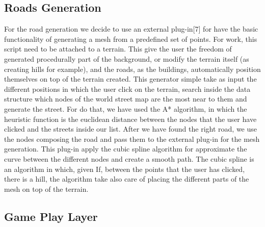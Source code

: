 \documentclass[conference]{IEEEtran}
\begin{document}
\subsection{Roads Generation}

For the road generation we decide to use an external plug-in[7] for have the basic functionality of generating a mesh from a predefined set of points. For work, this script need to be attached to a terrain. This give the user the freedom of generated procedurally part of the background, or modify the terrain itself (as creating hills for example), and the roads, as the buildings, automatically position themselves on top of the terrain created. This generator simple take as input the different positions in which the user click on the terrain, search inside the data structure which nodes of the world street map are the most near to them and generate the street. For do that, we have used the A* algorithm, in which the heuristic function is the euclidean distance between the nodes that the user have clicked and the streets inside our list. After we have found the right road, we use the nodes composing the road and pass them to the external plug-in for the mesh generation. This plug-in apply the cubic spline algorithm for approximate the curve between the different nodes and create a smooth path. The cubic spline is an algorithm in which, given  If, between the points that the user has clicked, there is a hill, the algorithm take also care of placing the different parts of the mesh on top of the terrain. 

\subsection{Game Play Layer}
\end{document}
